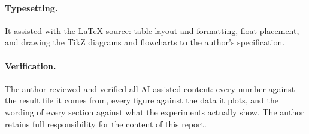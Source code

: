 \documentclass[report.tex]{subfiles}
\begin{document}
\paragraph{Typesetting.} It assisted with the \LaTeX{} source: table layout
and formatting, float placement, and drawing the TikZ diagrams and flowcharts
to the author's specification.

\paragraph{Verification.} The author reviewed and verified all AI-assisted
content: every number against the result file it comes from, every figure
against the data it plots, and the wording of every section against what the
experiments actually show. The author retains full responsibility for the
content of this report.
\end{document}
